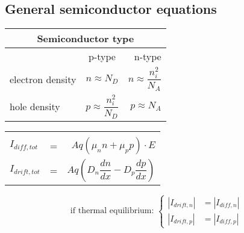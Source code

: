 \documentclass{article}
\begin{document}
\subsection*{General semiconductor equations}
\begin{minipage}[t]{0.5\linewidth}
\vspace{0pt}
\setlength{\fboxsep}{0pt}
\setlength{\fboxrule}{0.5pt}
\hfill
\begin{minipage}[t]{0.7\linewidth}
\vspace{0pt}
\centering
\begin{tabular}{lcr}
    \multicolumn{3}{c}{Semiconductor type} \\
    \toprule
    & p-type & n-type \\
    \midrule
    electron density & $n\approx N_D$ & $n\approx\dfrac{n_i^2}{N_A}$ \\[0.4cm]
    hole density     & $p\approx\dfrac{n_i^2}{N_D}$ & $p\approx N_A$ \\[0.4cm]
    \bottomrule
\end{tabular}
\end{minipage}

\begin{minipage}[t]{\textwidth}
\vspace{16pt}
\centering
\begin{tabular}{lcr}
    \toprule
    \\[-8pt]
    $I_{diff,tot}$ &=& $Aq(\mu_n n+\mu_p p)\cdot E$ \\[0.4cm]
    $I_{drift,tot}$ &=& $Aq\left(D_n\dfrac{dn}{dx}-D_p\dfrac{dp}{dx}\right)$ \\[0.4cm]
    \bottomrule
\end{tabular}
\vspace{10pt}
$$
\mbox{if thermal equilibrium: }
\left\{
\begin{array}{ll}
|I_{drift,n}|&=|I_{diff,n}| \\[0.4cm]
|I_{drift,p}|&=|I_{diff,p}|
\end{array}
\right.
$$
\end{minipage}
\end{minipage}
\end{document}
